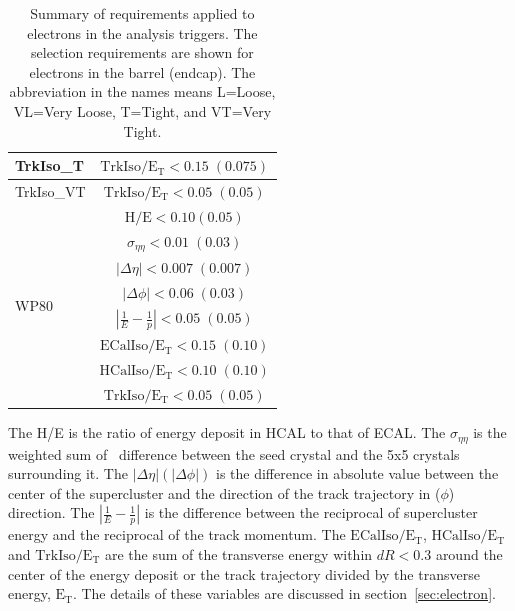 \begin{table}[!ht]
\begin{tabular}{l|c}
    \hline
    TrkIso\_T                   & $\mathrm{TrkIso/E_T <0.15\;(0.075)}$ \\
    \hline
    TrkIso\_VT                   & $\mathrm{TrkIso/E_T <0.05\;(0.05)}$ \\
    \hline \hline
    \multirow{8}{*}{WP80} 		& $\mathrm{H/E < 0.10 (0.05) }$ \\
                               	& $\sigma_{\eta\eta}\mathrm{< 0.01\;(0.03)}$ \\
    							& $|\Delta\eta|\mathrm{< 0.007\; (0.007)}$ \\
                               	& $|\Delta\phi|\mathrm{< 0.06\;(0.03)}$  \\
                               	& $|\frac{1}{E}-\frac{1}{p}|\mathrm{< 0.05\;(0.05)}$  \\
    							& $\mathrm{ECalIso/E_T <0.15\;(0.10)}$ \\
                                & $\mathrm{HCalIso/E_T <0.10\;(0.10)}$ \\
                       			& $\mathrm{TrkIso/E_T <0.05\;(0.05)}$\\
    \hline
 \end{tabular}
 \caption{Summary of requirements applied to electrons in the analysis triggers.
The selection requirements are shown for electrons in the barrel (endcap).
The abbreviation in the names means L=Loose, VL=Very Loose, T=Tight, and VT=Very Tight.}
 \label{tab:trg_requirement_def}
\end{table}
The H/E is the ratio of energy deposit in HCAL to that of ECAL. 
The $\sigma_{\eta\eta}$ is the weighted sum of \Eta\ difference between the 
seed crystal and the 5x5 crystals surrounding it.   
The $|\Delta\eta|(|\Delta\phi|)$ is the difference in absolute value between 
the center of the supercluster and the direction of the track trajectory 
in \Eta($\phi$) direction.   
The $|\frac{1}{E}-\frac{1}{p}|$ is the difference between 
the reciprocal of supercluster energy 
and the reciprocal of the track momentum.  
The $\mathrm{ECalIso/E_T}$, $\mathrm{HCalIso/E_T}$ and $\mathrm{TrkIso/E_T}$ 
are the sum of the transverse energy within $dR<0.3$ %
around the center of the energy deposit or the track trajectory
divided by the transverse energy, $\mathrm{E_T}$.
The details of these variables are discussed in section~\ref{sec:electron}.

